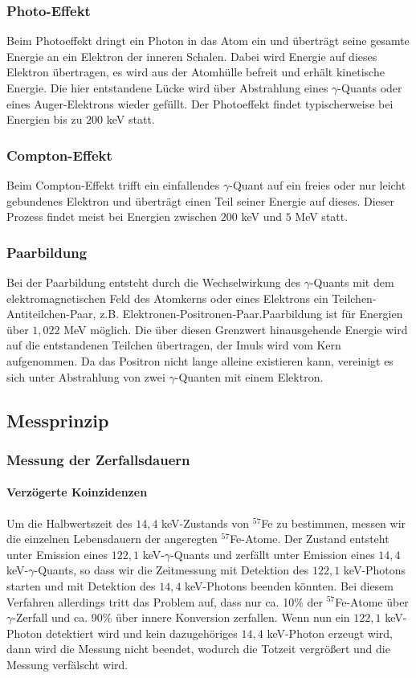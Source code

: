 \documentclass[12pt]{article}
\begin{document}
 \subsubsection{Photo-Effekt}
 Beim Photoeffekt dringt ein Photon in das Atom ein und überträgt seine gesamte Energie an ein Elektron der inneren Schalen. Dabei wird Energie auf dieses Elektron übertragen, es wird aus der Atomhülle befreit und erhält kinetische Energie. Die hier entstandene Lücke wird über Abstrahlung eines $\gamma$-Quants oder eines Auger-Elektrons wieder gefüllt.
 Der Photoeffekt findet typischerweise bei Energien bis zu $200$ keV statt.
 \subsubsection{Compton-Effekt}
 Beim Compton-Effekt trifft ein einfallendes $\gamma$-Quant auf ein freies oder nur leicht gebundenes Elektron und überträgt einen Teil seiner Energie auf dieses. Dieser Prozess findet meist bei Energien zwischen $200$ keV und $5$ MeV statt.
 \subsubsection{Paarbildung}
 Bei der Paarbildung entsteht durch die Wechselwirkung des $\gamma$-Quants mit dem elektromagnetischen Feld des Atomkerns oder eines Elektrons ein Teilchen-Antiteilchen-Paar, z.B. Elektronen-Positronen-Paar.Paarbildung ist für Energien über $1,022$ MeV möglich. Die über diesen Grenzwert hinausgehende Energie wird auf die entstandenen Teilchen übertragen, der Imuls wird vom Kern aufgenommen. Da das Positron nicht lange alleine existieren kann, vereinigt es sich unter Abstrahlung von zwei $\gamma$-Quanten mit einem Elektron.
 \subsection{Messprinzip}
 \subsubsection{Messung der Zerfallsdauern}
 
 \paragraph{Verzögerte Koinzidenzen}Um die Halbwertszeit des $14,4$ keV-Zustands von $^{57}$Fe zu bestimmen, messen wir die einzelnen Lebensdauern der angeregten $^{57}$Fe-Atome. Der Zustand entsteht unter Emission eines $122,1$ keV-$\gamma$-Quants und zerfällt unter Emission eines $14,4$ keV-$\gamma$-Quants, so dass wir die Zeitmessung mit Detektion des $122,1$ keV-Photons starten und mit Detektion des $14,4$ keV-Photons beenden könnten. Bei diesem Verfahren allerdings tritt das Problem auf, dass nur ca. 10\% der $^{57}$Fe-Atome über $\gamma$-Zerfall und ca. 90\% über innere Konversion zerfallen. Wenn nun ein $122,1$ keV-Photon detektiert wird und kein dazugehöriges $14,4$ keV-Photon erzeugt wird, dann wird die Messung nicht beendet, wodurch die Totzeit vergrößert und die Messung verfälscht wird. 
 
\end{document}

